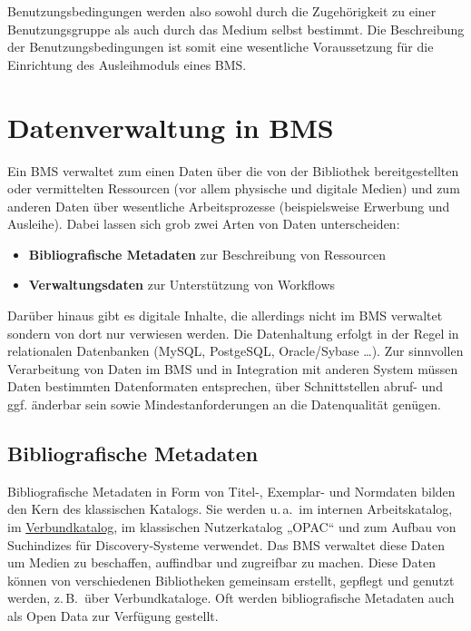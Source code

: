 \documentclass[
  11pt,
  letterpaper,
  DIV=11,
  twoside]{scrreprt}
\begin{document}
Benutzungsbedingungen werden also sowohl durch die Zugehörigkeit zu
einer Benutzungsgruppe als auch durch das Medium selbst bestimmt. Die
Beschreibung der Benutzungsbedingungen ist somit eine wesentliche
Voraussetzung für die Einrichtung des Ausleihmoduls eines BMS.

\section{Datenverwaltung in BMS}\label{datenverwaltung-in-bms}

Ein BMS verwaltet zum einen Daten über die von der Bibliothek
bereitgestellten oder vermittelten Ressourcen (vor allem physische und
digitale Medien) und zum anderen Daten über wesentliche Arbeitsprozesse
(beispielsweise Erwerbung und Ausleihe). Dabei lassen sich grob zwei
Arten von Daten unterscheiden:

\begin{itemize}
\item
  \textbf{Bibliografische Metadaten} zur Beschreibung von Ressourcen
\item
  \textbf{Verwaltungsdaten} zur Unterstützung von Workflows
\end{itemize}

Darüber hinaus gibt es digitale Inhalte, die allerdings nicht im BMS
verwaltet sondern von dort nur verwiesen werden. Die Datenhaltung
erfolgt in der Regel in relationalen Datenbanken (MySQL, PostgeSQL,
Oracle/Sybase \ldots). Zur sinnvollen Verarbeitung von Daten im BMS und
in Integration mit anderen System müssen Daten bestimmten Datenformaten
entsprechen, über Schnittstellen abruf- und ggf. änderbar sein sowie
Mindestanforderungen an die Datenqualität genügen.

\subsection{Bibliografische Metadaten}\label{bibliografische-metadaten}

Bibliografische Metadaten in Form von Titel-, Exemplar- und Normdaten
bilden den Kern des klassischen Katalogs. Sie werden u.\,a.~im internen
Arbeitskatalog, im \hyperref[verbundkataloge]{Verbundkatalog}, im
klassischen Nutzerkatalog „OPAC`` und zum Aufbau von Suchindizes für
Discovery-Systeme verwendet. Das BMS verwaltet diese Daten um Medien zu
beschaffen, auffindbar und zugreifbar zu machen. Diese Daten können von
verschiedenen Bibliotheken gemeinsam erstellt, gepflegt und genutzt
werden, z.\,B.~über Verbundkataloge. Oft werden bibliografische
Metadaten auch als Open Data zur Verfügung gestellt.
\end{document}
